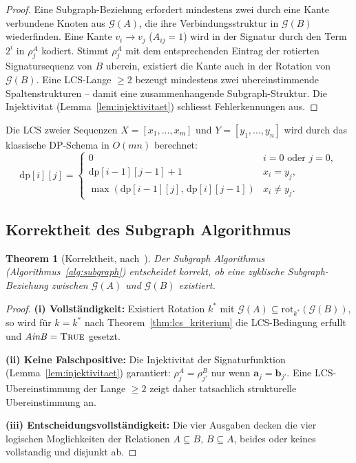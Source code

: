 \documentclass[a4paper, 12pt, twoside, openright]{report}
\newtheorem{theorem}{Theorem}[section]
\theoremstyle{definition}
\theoremstyle{definition}
\begin{document}
\begin{proof}
Eine Subgraph-Beziehung erfordert mindestens zwei durch eine Kante verbundene
Knoten aus $\mathcal{G}(A)$, die ihre Verbindungsstruktur in $\mathcal{G}(B)$
wiederfinden. Eine Kante $v_i \to v_j$ ($A_{ij}=1$) wird in der Signatur durch
den Term $2^i$ in $\rho_j^A$ kodiert. Stimmt $\rho_j^A$ mit dem entsprechenden
Eintrag der rotierten Signatursequenz von $B$ uberein, existiert die Kante auch
in der Rotation von $\mathcal{G}(B)$. Eine LCS-Lange $\geq 2$ bezeugt mindestens
zwei ubereinstimmende Spaltenstrukturen -- damit eine zusammenhangende Subgraph-Struktur.
Die Injektivitat (Lemma~\ref{lem:injektivitaet}) schliesst Fehlerkennungen aus.
\end{proof}

Die LCS zweier Sequenzen $X = [x_1,\ldots,x_m]$ und $Y = [y_1,\ldots,y_n]$ wird
durch das klassische DP-Schema in $O(mn)$ berechnet:
\begin{equation}
  \mathrm{dp}[i][j] = \begin{cases}
    0 & i=0 \text{ oder } j=0, \\
    \mathrm{dp}[i-1][j-1]+1 & x_i = y_j, \\
    \max(\mathrm{dp}[i-1][j],\,\mathrm{dp}[i][j-1]) & x_i \neq y_j.
  \end{cases}
  \label{eq:lcs_dp}
\end{equation}

\subsection{Korrektheit des Subgraph Algorithmus}

\begin{theorem}[Korrektheit, nach~\citep{epp2026subgraph}]
\label{thm:korrektheit_subgraph}
Der Subgraph Algorithmus (Algorithmus~\ref{alg:subgraph}) entscheidet korrekt,
ob eine zyklische Subgraph-Beziehung zwischen $\mathcal{G}(A)$ und $\mathcal{G}(B)$ existiert.
\end{theorem}

\begin{proof}
\textbf{(i) Vollständigkeit:} Existiert Rotation $k^*$ mit
$\mathcal{G}(A) \subseteq \mathrm{rot}_{k^*}(\mathcal{G}(B))$, so wird für $k=k^*$
nach Theorem~\ref{thm:lcs_kriterium} die LCS-Bedingung erfullt und
$\mathit{AinB}=\textsc{True}$ gesetzt.

\textbf{(ii) Keine Falschpositive:} Die Injektivitat der Signaturfunktion
(Lemma~\ref{lem:injektivitaet}) garantiert: $\rho_j^A = \rho_{j'}^B$ nur wenn
$\bm{a}_j = \bm{b}_{j'}$. Eine LCS-Ubereinstimmung der Lange $\geq 2$ zeigt daher
tatsachlich strukturelle Ubereinstimmung an.

\textbf{(iii) Entscheidungsvollständigkeit:} Die vier Ausgaben decken die vier
logischen Moglichkeiten der Relationen $A \subseteq B$, $B \subseteq A$, beides
oder keines vollstandig und disjunkt ab.
\end{proof}
\end{document}

